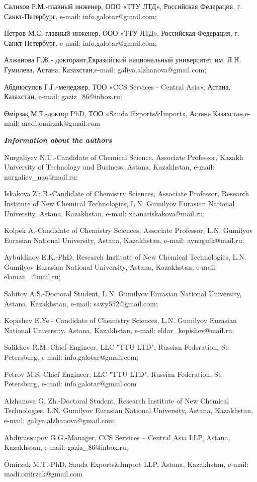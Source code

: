\begin{noparindent}
Салихов Р.М.-главный инженер, ООО «ТТУ ЛТД», Российская Федерация, г.
Санкт-Петербург, e-mail: info.galotar@gmail.com;

Петров М.С.-главный инженер, ООО «ТТУ ЛТД», Российская Федерация, г.
Санкт-Петербург, e-mail: info.galotar@gmail.com;

Алжанова Г.Ж.- докторант,Евразийский национальный университет им. Л.Н.
Гумилева, Астана, Казахстан,e-mail: galiya.alzhanova@gmail.com;

Абдиюсупов Г.Г.-менеджер, ТОО «CCS Services - Central Asia», Астана,
Казахстан, e-mail: gaziz\_86@inbox.ru;

Өмірзақ М.Т.-доктор PhD, ТОО «Sauda Exports\&Import»,
Астана,Казахстан,e-mail: madi.omirzak@gmail.com
\end{noparindent}

\emph{{\bfseries Information about the authors}}

\begin{noparindent}
Nurgaliyev N.U.-Candidate of Chemical Science, Associate Professor,
Kazakh University of Technology and Business, Astana, Kazakhstan,
e-mail: nurgaliev\_nao@mail.ru;

Iskakova Zh.B.-Candidate of Chemistry Sciences, Associate Professor,
Research Institute of New Chemical Technologies, L.N. Gumilyov Eurasian
National University, Astana, Kazakhstan, e-mail: zhanariskakova@mail.ru;

Kolpek A.-Candidate of Chemistry Sciences, Associate Professor, L.N.
Gumilyov Eurasian National University, Astana, Kazakhstan, e-mail:
aynagulk@mail.ru;

Aybuldinov E.K.-PhD, Research Institute of New Chemical Technologies,
L.N. Gumilyov Eurasian National University, Astana, Kazakhstan, e-mail:
elaman\_@mail.ru;

Sabitov A.S.-Doctoral Student, L.N. Gumilyov Eurasian National
University, Astana, Kazakhstan, e-mail: sawy552@gmail.com;

Kopishev E.Ye.- Candidate of Chemistry Sciences, L.N. Gumilyov Eurasian
National University, Astana, Kazakhstan, e-mail:
eldar\_kopishev@mail.ru;

Salikhov R.M.-Chief Engineer, LLC "TTU LTD", Russian Federation, St.
Petersburg, e-mail: info.galotar@gmail.com;

Petrov M.S.-Chief Engineer, LLC "TTU LTD", Russian Federation, St.
Petersburg, e-mail: info.galotar@gmail.com

Alzhanova G. Zh.-Doctoral Student, Research Institute of New Chemical
Technologies, L.N. Gumilyov Eurasian National University, Astana,
Kazakhstan, e-mail: galiya.alzhanova@gmail.com;

Abdiyus{\bfseries s}upov G.G.-Manager, CCS Services -- Central Asia LLP,
Astana, Kazakhstan, e-mail: gaziz\_86@inbox.ru;

Ómirzak M.T.-PhD, Sauda Exports\&Import LLP, Astana, Kazakhstan, e-mail:
madi.omirzak@gmail.com
\end{noparindent}
